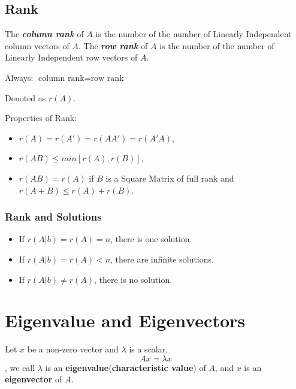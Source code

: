 \subsection{Rank}

\begin{definition}
    The \textbf{\textit{column rank}} of $A$ is the number of the number of Linearly Independent column vectors of $A$.    The \textbf{\textit{row rank}} of $A$ is the number of the number of Linearly Independent row vectors of $A$.

    Always: $\text{column rank} = \text{row rank}$

    Denoted as $r(A)$.
\end{definition}

Properties of Rank:
\begin{itemize}
    \item $r(A) = r(A') = r(AA') = r(A'A)$,
    \item $r(AB) \leq min[r(A),r(B)]$,
    \item $r(AB)= r(A)$ if $B$ is a Square Matrix of full rank and $r(A+B) \leq r(A) + r(B)$.
\end{itemize}

\subsubsection{Rank and Solutions}

\begin{itemize}
    \item If $r(A|b)=r(A) = n$, there is one solution.
    \item If $r(A|b)=r(A) < n$, there are infinite solutions.
    \item If $r(A|b) \neq  r(A)$, there is no solution.
\end{itemize}

\section{Eigenvalue and Eigenvectors}

\begin{definition}
    Let $x$ be a non-zero vector and $\lambda$ is a scalar, \begin{equation*}
        Ax=\lambda x
    \end{equation*}
    , we call $\lambda$ is an \textbf{eigenvalue}(\textbf{characteristic value}) of $A$, and $x$ is an \textbf{eigenvector} of $A$.
\end{definition}

